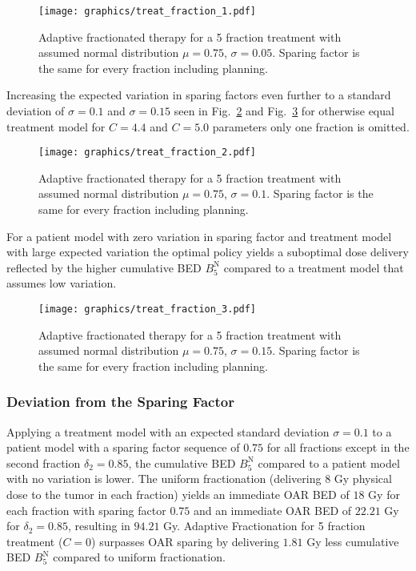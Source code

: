 \documentclass[\relativeRoot/ada.tex]{subfiles}
\begin{document}
\begin{figure}[!htb]
    \centering
    \texttt{[image: graphics/treat\_fraction\_1.pdf]}
    \caption{Adaptive fractionated therapy for a 5 fraction treatment with assumed normal distribution $\mu=0.75$, $\sigma=0.05$. Sparing factor is the same for every fraction including planning.}
    \label{fig:treat_fraction_1}
\end{figure}

Increasing the expected variation in sparing factors even further to a standard deviation of $\sigma=0.1$ and $\sigma=0.15$ seen in Fig.~\ref{fig:treat_fraction_2} and Fig.~\ref{fig:treat_fraction_3} for otherwise equal treatment model for $C=4.4$ and $C=5.0$ parameters only one fraction is omitted.

\begin{figure}[!htb]
    \centering
    \texttt{[image: graphics/treat\_fraction\_2.pdf]}
    \caption{Adaptive fractionated therapy for a 5 fraction treatment with assumed normal distribution $\mu=0.75$, $\sigma=0.1$. Sparing factor is the same for every fraction including planning.}
    \label{fig:treat_fraction_2}
\end{figure}

For a patient model with zero variation in sparing factor and treatment model with large expected variation the optimal policy yields a suboptimal dose delivery reflected by the higher cumulative BED $B_5^{\text{N}}$ compared to a treatment model that assumes low variation.

\begin{figure}[!htb]
    \centering
    \texttt{[image: graphics/treat\_fraction\_3.pdf]}
    \caption{Adaptive fractionated therapy for a 5 fraction treatment with assumed normal distribution $\mu=0.75$, $\sigma=0.15$. Sparing factor is the same for every fraction including planning.}
    \label{fig:treat_fraction_3}
\end{figure}

\subsubsection{Deviation from the Sparing Factor}

Applying a treatment model with an expected standard deviation $\sigma=0.1$ to a patient model with a sparing factor sequence of $0.75$ for all fractions except in the second fraction $\delta_2 = 0.85$, the cumulative BED $B_5^{\text{N}}$ compared to a patient model with no variation is lower. The uniform fractionation (delivering $8$ Gy physical dose to the tumor in each fraction) yields an immediate OAR BED of $18$ Gy for each fraction with sparing factor $0.75$ and an immediate OAR BED of $22.21$ Gy for $\delta_2=0.85$, resulting in $94.21$ Gy. Adaptive Fractionation for 5 fraction treatment ($C=0$) surpasses OAR sparing by delivering $1.81$ Gy less cumulative BED $B_5^{\text{N}}$ compared to uniform fractionation.
\end{document}
